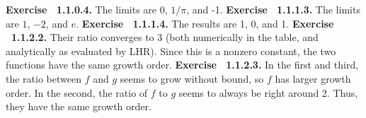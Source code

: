 \par 
 {\noindent \protect \bf  Exercise ~1.1.0.4.} The limits are 0, $1/\pi $, and -1.  \protect \newline  \protect \newline  
 {\noindent \protect \bf  Exercise ~1.1.1.3.} The limits are $1$, $-2$, and $e$.  \protect \newline  \protect \newline  
 {\noindent \protect \bf  Exercise ~1.1.1.4.} The results are 1, 0, and 1. \protect \newline  \protect \newline  
 {\noindent \protect \bf  Exercise ~1.1.2.2.} Their ratio converges to 3 (both numerically in the table, and analytically as evaluated by LHR). Since this is a nonzero constant, the two functions have the same growth order. \protect \newline  \protect \newline  
 {\noindent \protect \bf  Exercise ~1.1.2.3.} In the first and third, the ratio between $f$ and $g$ seems to grow without bound, so $f$ has larger growth order. In the second, the ratio of $f$ to $g$ seems to always be right around 2. Thus, they have the same growth order. \protect \newline  \protect \newline  
